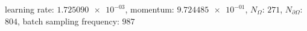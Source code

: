 learning rate: $\num[scientific-notation=true]{1.725090e-03}$, momentum: $\num[scientific-notation=true]{9.724485e-01}$, $N_{\Omega}$: $\num[scientific-notation=false]{271}$, $N_{\partial\Omega}$: $\num[scientific-notation=false]{804}$, batch sampling frequency: $\num[scientific-notation=false]{987}$